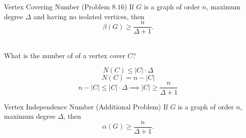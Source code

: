 \begin{frame}{}
  \begin{exampleblock}{Vertex Covering Number (Problem $8.16$)}
    If $G$ is a graph of order $n$, maximum degree $\Delta$ 
    and having no isolated vertices, then 
    \[
      \beta(G) \ge \frac{n}{\Delta + 1}.
    \]
  \end{exampleblock}

  \pause
  \begin{center}
     \\[5pt]
    What is the number of  of a vertex cover $C$?
  \end{center}

  \pause
  \[
    N(C) \le |C| \cdot \Delta
  \]
  \pause
  \[
    N(C) = n - |C|
  \]
  \pause
  \[
    n - |C| \le |C| \cdot \Delta \implies |C| \ge \frac{n}{\Delta + 1}
  \]
\end{frame}

\begin{frame}{}
  \begin{exampleblock}{Vertex Independence Number (Additional Problem)}
    If $G$ is a graph of order $n$, maximum degree $\Delta$, then
    \[
      \alpha(G) \ge \frac{n}{\Delta + 1}.
    \]
  \end{exampleblock}

  \pause
  \begin{center}
     \\[6pt] \pause
  \end{center}

  \pause
  \begin{columns}
      
  \end{columns}
\end{frame}

